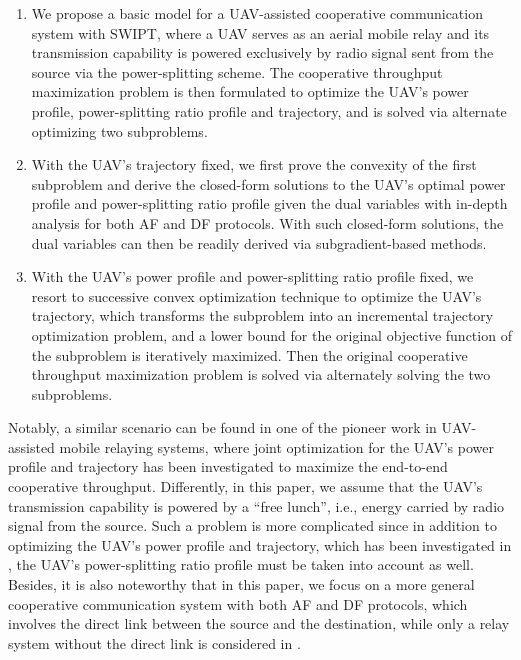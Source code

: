 \documentclass[12pt, draftclsnofoot, onecolumn]{IEEEtran}
\begin{document}
\begin{enumerate}
\item We propose a basic model for a UAV-assisted cooperative communication system with SWIPT, where a UAV serves as an aerial mobile relay and its transmission capability is powered exclusively by radio signal sent from the source via the power-splitting scheme. The cooperative throughput maximization problem is then formulated to optimize the UAV's power profile, power-splitting ratio profile and trajectory, and is solved via alternate optimizing two subproblems.

\item With the UAV's trajectory fixed, we first prove the convexity of the first subproblem and derive the closed-form solutions to the UAV's optimal power profile and power-splitting ratio profile given the dual variables with in-depth analysis for both AF and DF protocols. With such closed-form solutions, the dual variables can then be readily derived via subgradient-based methods.

\item With the UAV's power profile and power-splitting ratio profile fixed, we resort to successive convex optimization technique to optimize the UAV's trajectory, which transforms the subproblem into an incremental trajectory optimization problem, and a lower bound for the original objective function of the subproblem is iteratively maximized. Then the original cooperative throughput maximization problem is solved via alternately solving the two subproblems.

\end{enumerate}

Notably, a similar scenario can be found in one of the pioneer work in UAV-assisted mobile relaying systems, where joint optimization for the UAV's power profile and trajectory has been investigated to maximize the end-to-end cooperative throughput\cite{7572068}. Differently, in this paper, we assume that the UAV's transmission capability is powered by a ``free lunch'', i.e., energy carried by radio signal from the source. Such a problem is more complicated since in addition to optimizing the UAV's power profile and trajectory, which has been investigated in \cite{7572068}, the UAV's power-splitting ratio profile must be taken into account as well. Besides, it is also noteworthy that in this paper, we focus on a more general cooperative communication system with both AF and DF protocols, which involves the direct link between the source and the destination, while only a relay system without the direct link is considered in \cite{7572068}.
\end{document}
